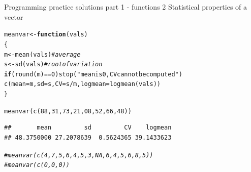 \documentclass[xcolor=table,           xcolor=dvipsnames]{beamer}\usepackage[]{graphicx}\usepackage[]{color}
\makeatletter
\newcommand{\hlnum}[1]{\textcolor[rgb]{0,0,0}{#1}}
\newcommand{\hlstr}[1]{\textcolor[rgb]{0.545,0.137,0.137}{#1}}
\newcommand{\hlcom}[1]{\textcolor[rgb]{0,0.392,0}{\textit{#1}}}
\newcommand{\hlopt}[1]{\textcolor[rgb]{0,0,0}{#1}}
\newcommand{\hlstd}[1]{\textcolor[rgb]{0,0,0}{#1}}
\newcommand{\hlkwa}[1]{\textcolor[rgb]{1,0,0}{\textbf{#1}}}
\newcommand{\hlkwb}[1]{\textcolor[rgb]{0,0,0}{#1}}
\newcommand{\hlkwc}[1]{\textcolor[rgb]{1,0,1}{#1}}
\newcommand{\hlkwd}[1]{\textcolor[rgb]{0,0,1}{#1}}
\newenvironment{kframe}{%
 \def\at@end@of@kframe{}%
 \ifinner\ifhmode%
  \def\at@end@of@kframe{\end{minipage}}%
  \begin{minipage}{\columnwidth}%
 \fi\fi%
 \def\FrameCommand##1{\hskip\@totalleftmargin \hskip-\fboxsep
 \colorbox{shadecolor}{##1}\hskip-\fboxsep
     \hskip-\linewidth \hskip-\@totalleftmargin \hskip\columnwidth}%
 \MakeFramed {\advance\hsize-\width
   \@totalleftmargin\z@ \linewidth\hsize
   \@setminipage}}%
 {\par\unskip\endMakeFramed%
 \at@end@of@kframe}
\newenvironment{knitrout}{}{} %
\makeatother
\begin{document}
\begin{frame}[fragile]{Programming practice solutions part 1 - functions 2}
Statistical properties of a vector
\begin{knitrout}
\color{fgcolor}\begin{kframe}
\begin{alltt}
\hlstd{meanvar} \hlkwb{<-} \hlkwa{function}\hlstd{(}\hlkwc{vals}\hlstd{)}
  \hlstd{\{}
  \hlstd{m} \hlkwb{<-} \hlkwd{mean}\hlstd{(vals)} \hlcom{# average}
  \hlstd{s} \hlkwb{<-} \hlkwd{sd}\hlstd{(vals)} \hlcom{# root of variation}
  \hlkwa{if}\hlstd{(}\hlkwd{round}\hlstd{(m)}\hlopt{==}\hlnum{0}\hlstd{)} \hlkwd{stop}\hlstd{(}\hlstr{"mean is 0, CV cannot be computed"}\hlstd{)}
  \hlkwd{c}\hlstd{(}\hlkwc{mean}\hlstd{=m,} \hlkwc{sd}\hlstd{=s,} \hlkwc{CV}\hlstd{=s}\hlopt{/}\hlstd{m,} \hlkwc{logmean}\hlstd{=}\hlkwd{logmean}\hlstd{(vals))}
  \hlstd{\}}

\hlkwd{meanvar}\hlstd{(}\hlkwd{c}\hlstd{(}\hlnum{88}\hlstd{,}\hlnum{31}\hlstd{,}\hlnum{73}\hlstd{,}\hlnum{21}\hlstd{,}\hlnum{08}\hlstd{,}\hlnum{52}\hlstd{,}\hlnum{66}\hlstd{,}\hlnum{48}\hlstd{))}
\end{alltt}
\begin{verbatim}
##       mean         sd         CV    logmean 
## 48.3750000 27.2078639  0.5624365 39.1433623
\end{verbatim}
\begin{alltt}
\hlcom{#meanvar(c(4,7,5,6,4,5,3,NA,6,4,5,6,8,5))}
\hlcom{#meanvar(c(0,0,0))}
\end{alltt}
\end{kframe}
\end{knitrout}
\end{frame}

\end{document}
